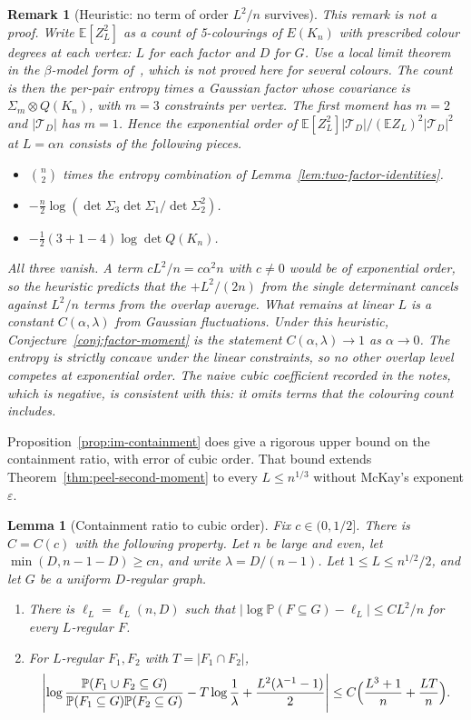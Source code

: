 \documentclass[11pt]{article}
\newtheorem{lemma}[theorem]{Lemma}
\newtheorem{remark}[theorem]{Remark}
\newcommand{\EE}{\mathbb{E}}
\newcommand{\PP}{\mathbb{P}}
\begin{document}
\begin{remark}[Heuristic: no term of order \(L^2/n\) survives]
\label{rem:no-l2n}
This remark is not a proof.
Write \(\EE[Z_L^2]\) as a count of 5-colourings of \(E(K_n)\) with prescribed
colour degrees at each vertex: \(L\) for each factor and \(D\) for \(G\).
Use a local limit theorem in the \(\beta\)-model form of~\cite{IM25}, which
is not proved here for several colours.
The count is then the per-pair entropy times a Gaussian factor whose
covariance is \(\Sigma_m\otimes Q(K_n)\), with \(m=3\) constraints per vertex.
The first moment has \(m=2\) and \(|\mathcal T_D|\) has \(m=1\).
Hence the exponential order of \(\EE[Z_L^2]|\mathcal T_D|/(\EE Z_L)^2|\mathcal T_D|^2\)
at \(L=\alpha n\) consists of the following pieces.
\begin{itemize}
\item \(\binom n2\) times the entropy combination of
Lemma~\ref{lem:two-factor-identities}.
\item \(-\frac n2\log(\det\Sigma_3\det\Sigma_1/\det\Sigma_2^2)\).
\item \(-\frac12(3+1-4)\log\det Q(K_n)\).
\end{itemize}
All three vanish.
A term \(cL^2/n=c\alpha^2n\) with \(c\ne0\) would be of exponential order, so
the heuristic predicts that the \(+L^2/(2n)\) from the single determinant
cancels against \(L^2/n\) terms from the overlap average.
What remains at linear \(L\) is a constant \(C(\alpha,\lambda)\) from
Gaussian fluctuations. Under this heuristic,
Conjecture~\ref{conj:factor-moment} is the statement
\(C(\alpha,\lambda)\to1\) as \(\alpha\to0\).
The entropy is strictly concave under the linear constraints, so no other
overlap level competes at exponential order.
The naive cubic coefficient recorded in the notes, which is negative, is
consistent with this: it omits terms that the colouring count includes.
\end{remark}

Proposition~\ref{prop:im-containment} does give a rigorous upper bound on
the containment ratio, with error of cubic order.
That bound extends Theorem~\ref{thm:peel-second-moment} to every
\(L\le n^{1/3}\) without McKay's exponent \(\varepsilon\).

\begin{lemma}[Containment ratio to cubic order]
\label{lem:containment-ratio}
Fix \(c\in(0,1/2]\). There is \(C=C(c)\) with the following property.
Let \(n\) be large and even, let \(\min(D,n-1-D)\ge cn\), and write
\(\lambda=D/(n-1)\). Let \(1\le L\le n^{1/2}/2\), and let \(G\) be a uniform
\(D\)-regular graph.
\begin{enumerate}
\item[(a)] There is \(\ell_L=\ell_L(n,D)\) such that
\(|\log\PP(F\subseteq G)-\ell_L|\le CL^2/n\) for every \(L\)-regular \(F\).
\item[(b)] For \(L\)-regular \(F_1,F_2\) with \(T=|F_1\cap F_2|\),
\[
\Biggl|\log\frac{\PP(F_1\cup F_2\subseteq G)}{\PP(F_1\subseteq G)\PP(F_2\subseteq G)}
-T\log\frac1\lambda+\frac{L^2(\lambda^{-1}-1)}2\Biggr|
\le
C\Bigl(\frac{L^3+1}{n}+\frac{LT}{n}\Bigr).
\]
\end{enumerate}
\end{lemma}
\end{document}
